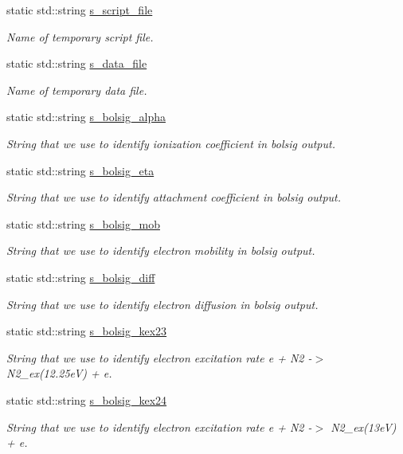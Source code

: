 \begin{DoxyCompactItemize}
\item 
static std\+::string \hyperlink{classair__bolsig_a8390d532f700845dc66e53328004972f}{s\+\_\+script\+\_\+file}
\begin{DoxyCompactList}\small\item\em Name of temporary script file. \end{DoxyCompactList}\item 
static std\+::string \hyperlink{classair__bolsig_a9b4fc9a13c1b01b14fc4cffbe0123fdf}{s\+\_\+data\+\_\+file}
\begin{DoxyCompactList}\small\item\em Name of temporary data file. \end{DoxyCompactList}\item 
static std\+::string \hyperlink{classair__bolsig_a27e88db58fa4c4b36fcc6b19b4772243}{s\+\_\+bolsig\+\_\+alpha}
\begin{DoxyCompactList}\small\item\em String that we use to identify ionization coefficient in bolsig output. \end{DoxyCompactList}\item 
static std\+::string \hyperlink{classair__bolsig_a674655e420372d7cb17dc55f0c4ed67a}{s\+\_\+bolsig\+\_\+eta}
\begin{DoxyCompactList}\small\item\em String that we use to identify attachment coefficient in bolsig output. \end{DoxyCompactList}\item 
static std\+::string \hyperlink{classair__bolsig_adc7d5591aed0216b0838c6735e066235}{s\+\_\+bolsig\+\_\+mob}
\begin{DoxyCompactList}\small\item\em String that we use to identify electron mobility in bolsig output. \end{DoxyCompactList}\item 
static std\+::string \hyperlink{classair__bolsig_a7783435ca318b61965e97cce4750444b}{s\+\_\+bolsig\+\_\+diff}
\begin{DoxyCompactList}\small\item\em String that we use to identify electron diffusion in bolsig output. \end{DoxyCompactList}\item 
static std\+::string \hyperlink{classair__bolsig_a3359df8c594a3b6de6de15f2020b6f21}{s\+\_\+bolsig\+\_\+kex23}
\begin{DoxyCompactList}\small\item\em String that we use to identify electron excitation rate e + N2 -\/$>$ N2\+\_\+ex(12.\+25eV) + e. \end{DoxyCompactList}\item 
static std\+::string \hyperlink{classair__bolsig_a493139d168bd72fd215199ffdeb019f0}{s\+\_\+bolsig\+\_\+kex24}
\begin{DoxyCompactList}\small\item\em String that we use to identify electron excitation rate e + N2 -\/$>$ N2\+\_\+ex(13e\+V) + e. \end{DoxyCompactList}\end{DoxyCompactItemize}


